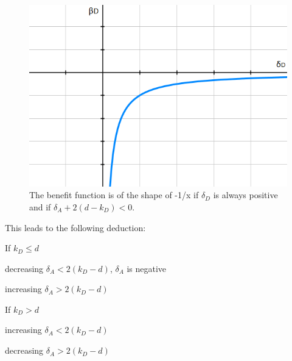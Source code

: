 \begin{figure}
\centering
\includegraphics[scale=0.5]{Images/ShapeDown.png} 
\caption{The benefit function is of the shape of -1/x if $\delta_{D}$ is always positive and if $\delta_{A} + 2(d-k_{D}) < 0$.}
\label{ShapeDown}
\end{figure}
%
This leads to the following deduction:
\begin{description}
\item If $k_{D} \leq d$ 
\begin{description}
\item decreasing $ \delta_{A} < 2(k_{D} -d)$, $ \delta_{A}$ is negative
\item increasing  $\delta_{A} > 2(k_{D} -d)$ 
\end{description}
\item If $k_{D} > d$ 
\begin{description}
\item increasing $ \delta_{A} < 2(k_{D} -d)$
\item decreasing  $\delta_{A} > 2(k_{D} -d)$ 
\end{description}
\end{description}
~~\\

